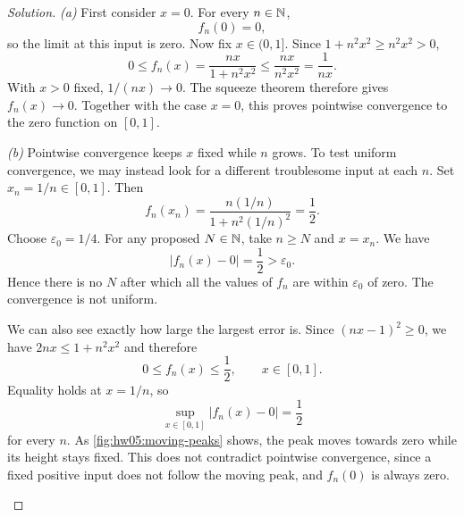 \begin{proof}[Solution]
  \textit{(a)} First consider $x=0$. For every $n\in\mathbb{N}$,
  \[
    f_n(0)=0,
  \]
  so the limit at this input is zero. Now fix $x\in(0,1]$. Since
  $1+n^2x^2\ge n^2x^2>0$,
  \[
    0\le f_n(x)=\frac{nx}{1+n^2x^2}
      \le\frac{nx}{n^2x^2}=\frac{1}{nx}.
  \]
  With $x>0$ fixed, $1/(nx)\to0$. The squeeze theorem therefore
  gives $f_n(x)\to0$. Together with the case $x=0$, this proves
  pointwise convergence to the zero function on $[0,1]$.

  \textit{(b)} Pointwise convergence keeps $x$ fixed while $n$ grows.
  To test uniform convergence, we may instead look for a different
  troublesome input at each $n$. Set $x_n=1/n\in[0,1]$. Then
  \[
    f_n(x_n)=\frac{n(1/n)}{1+n^2(1/n)^2}=\frac12.
  \]
  Choose $\varepsilon_0=1/4$. For any proposed $N\in\mathbb{N}$, take
  $n\ge N$ and $x=x_n$. We have
  \[
    |f_n(x)-0|=\frac12>\varepsilon_0.
  \]
  Hence there is no $N$ after which all the values of $f_n$ are
  within $\varepsilon_0$ of zero. The convergence is not uniform.

  We can also see exactly how large the largest error is. Since
  $(nx-1)^2\ge0$, we have $2nx\le1+n^2x^2$ and therefore
  \[
    0\le f_n(x)\le\frac12,\qquad x\in[0,1].
  \]
  Equality holds at $x=1/n$, so
  \[
    \sup_{x\in[0,1]}|f_n(x)-0|=\frac12
  \]
  for every $n$. As \autoref{fig:hw05:moving-peaks} shows, the peak
  moves towards zero while its height stays fixed. This does not
  contradict pointwise convergence, since a fixed positive input
  does not follow the moving peak, and $f_n(0)$ is always zero.

  \begin{marginfigure}
    \centering
    
    \caption[Moving peaks prevent uniform convergence.]{%
      The graphs for $n=2,4,8$ have peaks at $(1/n,1/2)$.
      The peaks move towards the origin without losing height.
      Uniform convergence to zero would require the entire graph
      eventually to lie in every horizontal band about the $x$-axis.}
    \label{fig:hw05:moving-peaks}
  \end{marginfigure}
\end{proof}
